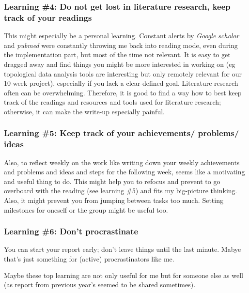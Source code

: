 \documentclass[journal, a4paper]{IEEEtran}
\begin{document}
\subsubsection{Learning \#4: Do not get lost in literature research, keep track of your readings}
This might especially be a personal learning. Constant alerts by \textit{Google scholar} and \textit{pubmed} were constantly throwing me back into reading mode, even during the implementation part, but most of the time not relevant. It is easy to get dragged away and find things you might be more interested in working on (eg topological data analysis tools are interesting but only remotely relevant for our 10-week project), especially if you lack a clear-defined goal. Literature research often can be overwhelming. Therefore, it is good to find a way how to best keep track of the readings and resources and tools used for literature research; otherwise, it can make the write-up especially painful. %

\hfill
\subsubsection{Learning \#5: Keep track of your achievements/ problems/ ideas}
Also, to reflect weekly on the work like writing down your weekly achievements and problems and ideas and steps for the following week, seems like a motivating and useful thing to do. This might help you to refocus and prevent to go overboard with the reading (see learning \#5) and fits my big-picture thinking. Also, it might prevent you from jumping between tasks too much. Setting milestones for oneself or the group might be useful too. 

\hfill
\subsubsection{Learning \#6: Don't procrastinate}
You can start your report early; don't leave things until the last minute. Mabye that's just something for (active) procrastinators like me.

\hfill
Maybe these top learning are not only useful for me but for someone else as well (as report from previous year's seemed to be shared sometimes).
\end{document}
